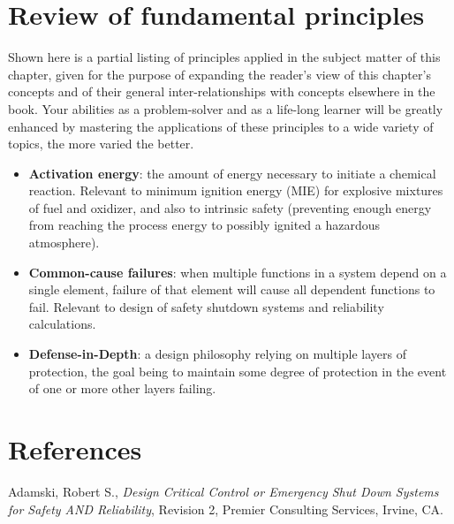 \filbreak
\section{Review of fundamental principles}

Shown here is a partial listing of principles applied in the subject matter of this chapter, given for the purpose of expanding the reader's view of this chapter's concepts and of their general inter-relationships with concepts elsewhere in the book.  Your abilities as a problem-solver and as a life-long learner will be greatly enhanced by mastering the applications of these principles to a wide variety of topics, the more varied the better.

\begin{itemize}
\item \textbf{Activation energy}: the amount of energy necessary to initiate a chemical reaction.  Relevant to minimum ignition energy (MIE) for explosive mixtures of fuel and oxidizer, and also to intrinsic safety (preventing enough energy from reaching the process energy to possibly ignited a hazardous atmosphere).
\item \textbf{Common-cause failures}: when multiple functions in a system depend on a single element, failure of that element will cause all dependent functions to fail.  Relevant to design of safety shutdown systems and reliability calculations.
\item \textbf{Defense-in-Depth}: a design philosophy relying on multiple layers of protection, the goal being to maintain some degree of protection in the event of one or more other layers failing.
\end{itemize}








\filbreak
\section*{References}


\noindent
Adamski, Robert S., \textit{Design Critical Control or Emergency Shut Down Systems for Safety AND Reliability}, Revision 2, Premier Consulting Services, Irvine, CA.

